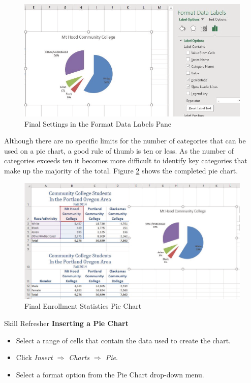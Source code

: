 \begin{figure}[H]
	\centering
	\includegraphics[width=\maxwidth{.95\linewidth}]{gfx/ch04_fig22}
	\caption{Final Settings in the Format Data Labels Pane}
	\label{04:fig22}
\end{figure}

Although there are no specific limits for the number of categories that can be used on a pie chart, a good rule of thumb is ten or less. As the number of  categories exceeds ten it becomes more difficult to identify key categories that make up the majority of the total. Figure \ref{04:fig23} shows the completed pie chart.

\begin{figure}[H]
	\centering
	\includegraphics[width=\maxwidth{.95\linewidth}]{gfx/ch04_fig23}
	\caption{Final Enrollment Statistics Pie Chart}
	\label{04:fig23}
\end{figure}

\begin{center}
	\begin{sklbox}{Skill Refresher}
		\textbf{Inserting a Pie Chart}
		\\
		\begin{itemize}
			\setlength{\itemsep}{0pt}
			\setlength{\parskip}{0pt}
			\setlength{\parsep}{0pt}

			\item Select a range of cells that contain the data used to create the chart.
			\item Click \textit{Insert $ \Rightarrow $ Charts $ \Rightarrow $ Pie}.
			\item Select a format option from the Pie Chart drop-down menu.
			
		\end{itemize}
	\end{sklbox}
\end{center}

